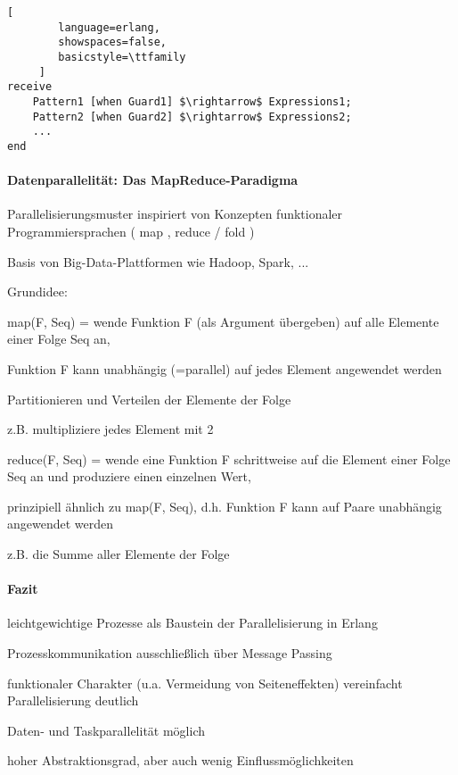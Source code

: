 \documentclass[10pt]{article}
\begin{document}
\begin{itemize*}
\begin{lstlisting}[
        language=erlang,
        showspaces=false,
        basicstyle=\ttfamily
     ]
receive
    Pattern1 [when Guard1] $\rightarrow$ Expressions1;
    Pattern2 [when Guard2] $\rightarrow$ Expressions2;
    ...
end
\end{lstlisting}

\paragraph{Datenparallelität: Das MapReduce-Paradigma}
\begin{itemize*}
  \item Parallelisierungsmuster inspiriert von Konzepten funktionaler Programmiersprachen ( map , reduce / fold )
  \item Basis von Big-Data-Plattformen wie Hadoop, Spark, ...
  \item Grundidee:
  \begin{itemize*}
    \item map(F, Seq) = wende Funktion F (als Argument übergeben) auf alle Elemente einer Folge Seq an,
    \begin{itemize*}
      \item Funktion F kann unabhängig (=parallel) auf jedes Element angewendet werden
      \item Partitionieren und Verteilen der Elemente der Folge
      \item z.B. multipliziere jedes Element mit 2
    \end{itemize*}
    \item reduce(F, Seq) = wende eine Funktion F schrittweise auf die Element einer Folge Seq an und produziere einen einzelnen Wert,
    \begin{itemize*}
      \item prinzipiell ähnlich zu map(F, Seq), d.h. Funktion F kann auf Paare unabhängig angewendet werden
      \item z.B. die Summe aller Elemente der Folge
    \end{itemize*}
  \end{itemize*}
\end{itemize*}

\paragraph{Fazit}
\begin{itemize*}
  \item leichtgewichtige Prozesse als Baustein der Parallelisierung in Erlang
  \item Prozesskommunikation ausschließlich über Message Passing
  \item funktionaler Charakter (u.a. Vermeidung von Seiteneffekten) vereinfacht Parallelisierung deutlich
  \item Daten- und Taskparallelität möglich
  \item hoher Abstraktionsgrad, aber auch wenig Einflussmöglichkeiten
\end{itemize*}




\end{itemize*}
\end{document}
